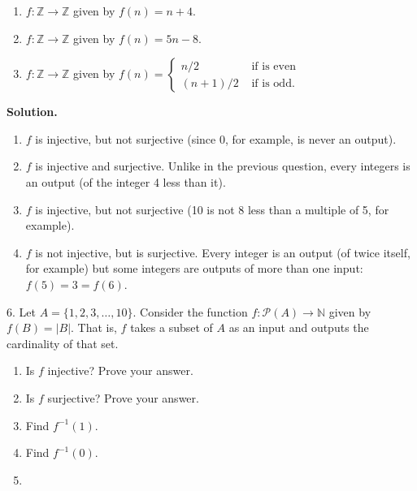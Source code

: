 \documentclass[10pt,]{book}
\theoremstyle{plain}
\theoremstyle{definition}
\theoremstyle{definition}
\theoremstyle{definition}
\numberwithin{equation}{section}
\def\N{\mathbb N}
\def\Z{\mathbb Z}
\def\pow{\mathcal P}
\def\inv{^{-1}}
\newcommand{\amp}{ & }
\begin{document}
\begin{exerciselist}
\begin{enumerate}[label=(\alph*)]
\item\hypertarget{li-314}{}\(f:\Z \to \Z\) given by \(f(n) = n+4\).%
\item\hypertarget{li-315}{}\(f:\Z \to \Z\) given by \(f(n) = 5n - 8\).%
\item\hypertarget{li-316}{}\(f:\Z \to \Z\) given by \(f(n) = \begin{cases}n/2 \amp  \mbox{ if  is even} \\ (n+1)/2 \amp \mbox{ if  is odd} . \end{cases}
              \)%
\end{enumerate}
\par\smallskip
\par\smallskip
\noindent\textbf{Solution.}\hypertarget{solution-49}{}\quad
\leavevmode%
\begin{enumerate}[label=(\alph*)]
\item\hypertarget{li-317}{}\(f\) is injective, but not surjective (since 0, for example, is never an output).%
\item\hypertarget{li-318}{}\(f\) is injective and surjective. Unlike in the previous question, every integers is an output (of the integer 4 less than it).%
\item\hypertarget{li-319}{}\(f\) is injective, but not surjective (10 is not 8 less than a multiple of 5, for example).%
\item\hypertarget{li-320}{}\(f\) is not injective, but is surjective. Every integer is an output (of twice itself, for example) but some integers are outputs of more than one input: \(f(5) = 3 = f(6)\).%
\end{enumerate}
\item[6.]\hypertarget{exercise-32}{}
            Let \(A = \{1,2,3,\ldots,10\}\). Consider the function \(f:\pow(A) \to \N\) given by \(f(B) = |B|\). That is, \(f\) takes a subset of \(A\) as an input and outputs the cardinality of that set.
\leavevmode%
\begin{enumerate}[label=(\alph*)]
\item\hypertarget{li-321}{}
                Is \(f\) injective? Prove your answer.
\item\hypertarget{li-322}{}
                Is \(f\) surjective? Prove your answer.
\item\hypertarget{li-323}{}
                Find \(f\inv(1)\).
\item\hypertarget{li-324}{}
                Find \(f\inv(0)\).
\item\hypertarget{li-325}{}

\end{enumerate}
\end{exerciselist}
\end{document}
